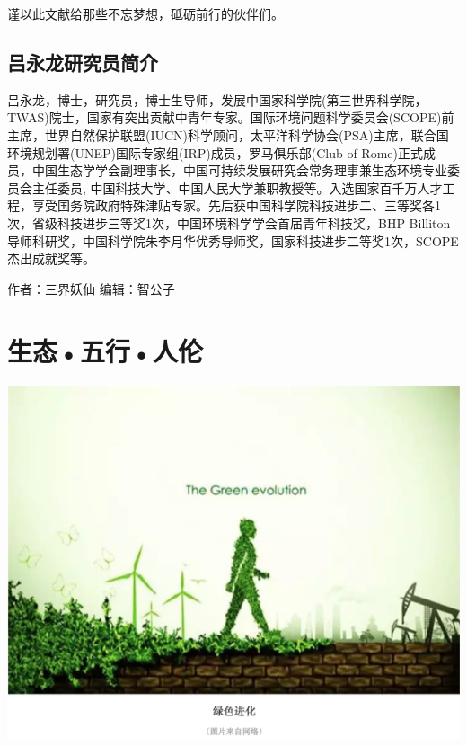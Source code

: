 \documentclass[]{book}
\begin{document}
谨以此文献给那些不忘梦想，砥砺前行的伙伴们。

\subsection{吕永龙研究员简介}

吕永龙，博士，研究员，博士生导师，发展中国家科学院(第三世界科学院，TWAS)院士，国家有突出贡献中青年专家。国际环境问题科学委员会(SCOPE)前主席，世界自然保护联盟(IUCN)科学顾问，太平洋科学协会(PSA)主席，联合国环境规划署(UNEP)国际专家组(IRP)成员，罗马俱乐部(Club
of
Rome)正式成员，中国生态学学会副理事长，中国可持续发展研究会常务理事兼生态环境专业委员会主任委员,
中国科技大学、中国人民大学兼职教授等。入选国家百千万人才工程，享受国务院政府特殊津贴专家。先后获中国科学院科技进步二、三等奖各1次，省级科技进步三等奖1次，中国环境科学学会首届青年科技奖，BHP
Billiton导师科研奖，中国科学院朱李月华优秀导师奖，国家科技进步二等奖1次，SCOPE杰出成就奖等。

作者：三界妖仙 编辑：智公子

\section{生态•五行•人伦}

\includegraphics[width=8.33in]{images/swr1}
\end{document}
